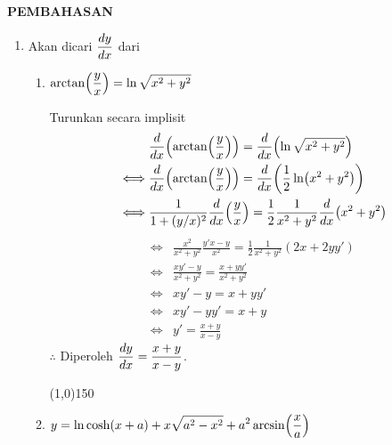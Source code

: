 \begin{center}
\textbf{\large{PEMBAHASAN}}
\end{center}
\begin{enumerate}[leftmargin=*, label={\arabic*}.]
\item Akan dicari $\displaystyle \frac{dy}{dx}$ dari 
    \begin{enumerate}[label={\alph*}.]
    \item $\ds \arctan\brk*{\frac{y}{x}}=\ln\sqrt{x^{2}+y^{2}}$
    
    Turunkan secara implisit
    \begin{align*}
        &\drv{x}{\arctan\brk*{\frac{y}{x}}} = \drv{x}{\ln\sqrt{x^{2}+y^{2}}}\\
        \iff &\drv{x}{\arctan\brk*{\frac{y}{x}}} 
        = \drv{x}{\frac{1}{2}\ln\brk*{x^{2}+y^{2}}}\\
        \iff &\frac{1}{1+(y/x)^{2}}\drv{x}{\frac{y}{x}} 
        = \frac{1}{2}\frac{1}{x^{2}+y^{2}}\drv{x}{x^{2}+y^{2}}\\
    \end{align*}
    \begin{align*}
        \iff &\frac{x^{2}}{x^{2}+y^{2}}\frac{y'x-y}{x^{2}} 
        = \frac{1}{2}\frac{1}{x^{2}+y^{2}}(2x+2yy')\\
        \iff &\frac{xy'-y}{x^{2}+y^{2}} = \frac{x+yy'}{x^{2}+y^{2}}\\
        \iff &xy'-y= x+yy'\\
        \iff &xy'-yy'= x+y\\
        \iff &y' = \frac{x+y}{x-y}
    \end{align*}
    $\therefore$ Diperoleh $\displaystyle \frac{dy}{dx} = \frac{x+y}{x-y}$.


\begin{center}\line(1,0){150}\end{center}


    \item $\ds y=\ln \cosh (x+a)+x\sqrt{a^{2}-x^{2}}+a^{2}\arcsin\brk*{\frac{x}{a}}$
    

\end{enumerate}
\end{enumerate}
